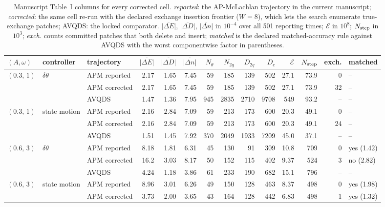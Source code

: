 \documentclass[10pt]{article}
\begin{document}
\begin{table}[H]\centering\scriptsize\setlength{\tabcolsep}{3pt}
\caption{Manuscript Table~I columns for every corrected cell.  \emph{reported}: the AP-McLachlan trajectory in the current manuscript; \emph{corrected}: the same cell re-run with the declared exchange insertion frontier ($W=8$), which lets the search enumerate true-exchange patches; AVQDS: the locked comparator.  $\overline{|\Delta E|}$, $\overline{|\Delta D|}$, $\overline{|\Delta n|}$ in $10^{-4}$ over all 501 reporting times; $\mathcal E$ in $10^{8}$; $N_{\rm step}$ in $10^{3}$; \emph{exch.} counts committed patches that both delete and insert; \emph{matched} is the declared matched-accuracy rule against AVQDS with the worst componentwise factor in parentheses.}
\begin{tabular}{lllrrrrrrrrrrl}\toprule
$(A,\omega)$ & controller & trajectory & $\overline{|\Delta E|}$ & $\overline{|\Delta D|}$ & $\overline{|\Delta n|}$ & $N_\theta$ & $N_{2q}$ & $D_{2q}$ & $D_c$ & $\mathcal E$ & $N_{\rm step}$ & exch. & matched \\ \midrule
$(0.3,\,1)$ & $\delta\theta$ & APM reported & 2.17 & 1.65 & 7.45 & 59 & 185 & 139 & 502 & 27.1 & 73.9 & 0 & -- \\
 &  & APM corrected & 2.17 & 1.65 & 7.45 & 59 & 185 & 139 & 502 & 27.1 & 73.9 & 32 & -- \\
 &  & AVQDS & 1.47 & 1.36 & 7.95 & 945 & 2835 & 2710 & 9708 & 549 & 93.2 & -- & -- \\
\addlinespace[2pt]
$(0.3,\,1)$ & state motion & APM reported & 2.16 & 2.84 & 7.09 & 59 & 213 & 173 & 600 & 20.3 & 49.1 & 0 & -- \\
 &  & APM corrected & 2.16 & 2.84 & 7.09 & 59 & 213 & 173 & 600 & 20.3 & 49.1 & 24 & -- \\
 &  & AVQDS & 1.51 & 1.45 & 7.92 & 370 & 2049 & 1933 & 7209 & 45.0 & 37.1 & -- & -- \\
\addlinespace[2pt]
$(0.6,\,3)$ & $\delta\theta$ & APM reported & 8.18 & 1.81 & 6.31 & 45 & 130 & 91 & 309 & 10.8 & 709 & 0 & yes (1.42) \\
 &  & APM corrected & 16.2 & 3.03 & 8.17 & 50 & 152 & 115 & 402 & 9.37 & 524 & 3 & no (2.82) \\
 &  & AVQDS & 4.24 & 1.18 & 3.86 & 61 & 233 & 190 & 682 & 15.1 & 796 & -- & -- \\
\addlinespace[2pt]
$(0.6,\,3)$ & state motion & APM reported & 8.96 & 3.01 & 6.26 & 49 & 150 & 128 & 463 & 8.37 & 498 & 0 & yes (1.98) \\
 &  & APM corrected & 3.73 & 2.00 & 3.65 & 43 & 164 & 128 & 442 & 6.83 & 498 & 1 & yes (1.32) \\

\end{tabular}
\end{table}
\end{document}
